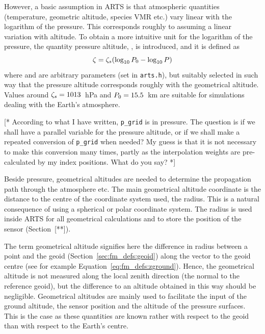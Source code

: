 However, a basic assumption in ARTS is that atmospheric quantities
(temperature, geometric altitude, species VMR etc.) vary linear with
the logarithm of the pressure. This corresponds roughly to assuming a
linear variation with altitude. To obtain a more intuitive unit for the
logarithm of the pressure, the quantity pressure altitude, \PrsAlt, is
introduced, and it is defined as
\begin{equation}
  \zeta = \zeta_{s}(\log_{10}P_{0} - \log_{10}P)
 \label{eq:fm_defs:prsalt}
\end{equation}
where  and  are arbitrary parameters (set in
\verb|arts.h|), but suitably selected in such way that the pressure
altitude corresponds roughly with the geometrical altitude. Values
around $\zeta_{s}=1013$~hPa and $P_{0}=15.5$~km are suitable for
simulations dealing with the Earth's atmosphere. 

[* According to what I have written, \verb|p_grid| is in pressure.
The question is if we shall have a parallel variable for the pressure
altitude, or if we shall make a repeated conversion of \verb|p_grid|
when needed? My guess is that it is not necessary to make this
conversion many times, partly as the interpolation weights are
pre-calculated by my index positions. What do you say? *]

 Beside pressure, geometrical altitudes
are needed to determine the propagation path through the atmosphere
etc. The main geometrical altitude coordinate is the distance to the
centre of the coordinate system used, the radius. This is a natural
consequence of using a spherical or polar coordinate system. The
radius is used inside ARTS for all geometrical calculations and to
store the position of the sensor (Section~[**]).

 The term
geometrical altitude signifies here the difference in radius between a
point and the geoid (Section~\ref{sec:fm_defs:geoid}) along the vector
to the geoid centre (see for example
Equation~\ref{eq:fm_defs:zground}). Hence, the geometrical altitude is
not measured along the local zenith direction (the normal to the
reference geoid), but the difference to an altitude obtained in this
way should be negligible. Geometrical altitudes are mainly used to
facilitate the input of the ground altitude, the sensor position and
the altitude of the pressure surfaces. This is the case as these
quantities are known rather with respect to the geoid than with
respect to the Earth's centre.



